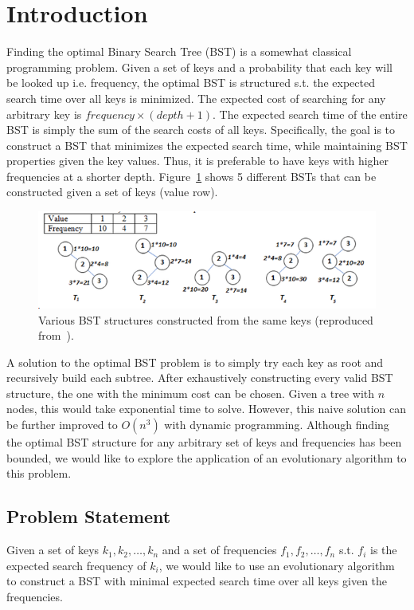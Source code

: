 
\section{Introduction}
\label{sec-introduction}

Finding the optimal Binary Search Tree (BST) is a somewhat classical programming problem. Given a set of keys and a probability that each key will be looked up i.e. frequency, the optimal BST is structured s.t. the expected search time over all keys is minimized. The expected cost of searching for any arbitrary key is $frequency \times (depth + 1)$. The expected search time of the entire BST is simply the sum of the search costs of all keys. Specifically, the goal is to construct a BST that minimizes the expected search time, while maintaining BST properties given the key values. Thus, it is preferable to have keys with higher frequencies at a shorter depth. Figure~\ref{fig:opt-bst} shows 5 different BSTs that can be constructed given a set of keys (value row).

\begin{figure}[h]
    \centering
    \includegraphics[width=0.9\columnwidth]{figures/opt_bst.png}
    \caption{ \small Various BST structures constructed from the same keys (reproduced from~\cite{bst_figure}).}
    \label{fig:opt-bst}
\end{figure}

A solution to the optimal BST problem is to simply try each key as root and recursively build each subtree. After exhaustively constructing every valid BST structure, the one with the minimum cost can be chosen. Given a tree with $n$ nodes, this would take exponential time to solve. However, this naive solution can be further improved to $O(n^3)$ with dynamic programming. Although finding the optimal BST structure for any arbitrary set of keys and frequencies has been bounded, we would like to explore the application of an evolutionary algorithm to this problem.

\subsection{Problem Statement}

Given a set of keys $k_1,k_2,\dots,k_n$ and a set of frequencies $f_1,f_2,\dots,f_n$ s.t. $f_i$ is the expected search frequency of $k_i$, we would like to use an evolutionary algorithm to construct a BST with minimal expected search time over all keys given the frequencies.
